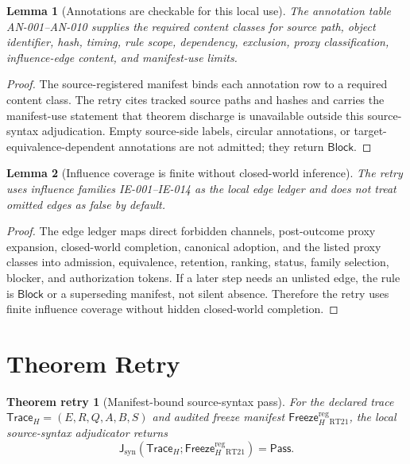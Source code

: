 \documentclass[11pt]{article}
\newcommand{\TraceH}{\mathsf{Trace}_{H}}
\newcommand{\FreezeH}{\mathsf{Freeze}_{H}}
\newcommand{\JudgeSyn}{\mathsf{J}_{\mathrm{syn}}}
\newcommand{\Pass}{\mathsf{Pass}}
\newcommand{\Block}{\mathsf{Block}}
\newtheorem{lemma}{Lemma}
\newtheorem{theoremattempt}{Theorem retry}
\begin{document}
\begin{lemma}[Annotations are checkable for this local use]
The annotation table AN-001--AN-010 supplies the required content classes
for source path, object identifier, hash, timing, rule scope, dependency,
exclusion, proxy classification, influence-edge content, and manifest-use
limits.
\end{lemma}

\begin{proof}
The source-registered manifest binds each annotation row to a required
content class. The retry cites tracked source paths and hashes and carries
the manifest-use statement that theorem discharge is unavailable outside
this source-syntax adjudication. Empty source-side labels, circular
annotations, or target-equivalence-dependent annotations are not admitted;
they return \(\Block\).
\end{proof}

\begin{lemma}[Influence coverage is finite without closed-world inference]
The retry uses influence families IE-001--IE-014 as the local edge ledger
and does not treat omitted edges as false by default.
\end{lemma}

\begin{proof}
The edge ledger maps direct forbidden channels, post-outcome proxy
expansion, closed-world completion, canonical adoption, and the listed proxy
classes into admission, equivalence, retention, ranking, status, family
selection, blocker, and authorization tokens. If a later step needs an
unlisted edge, the rule is \(\Block\) or a superseding manifest, not silent
absence. Therefore the retry uses finite influence coverage without hidden
closed-world completion.
\end{proof}

\section{Theorem Retry}

\begin{theoremattempt}[Manifest-bound source-syntax pass]
For the declared trace \(\TraceH=(E,R,Q,A,B,S)\) and audited freeze
manifest \(\FreezeH^{\mathrm{reg}}_{\mathrm{RT21}}\), the local
source-syntax adjudicator returns
\[
    \JudgeSyn(\TraceH;\FreezeH^{\mathrm{reg}}_{\mathrm{RT21}})
    = \Pass.
\]
\end{theoremattempt}
\end{document}
